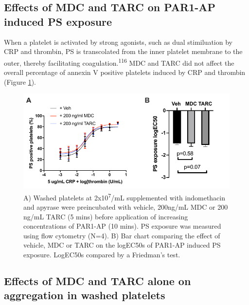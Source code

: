 \documentclass[11pt,twoside]{bristolthesis}
\begin{document}
\hypertarget{effects-of-mdc-and-tarc-on-par1-ap-induced-ps-exposure}{%
\subsection{Effects of MDC and TARC on PAR1-AP induced PS exposure}\label{effects-of-mdc-and-tarc-on-par1-ap-induced-ps-exposure}}

When a platelet is activated by strong agonists, such as dual stimiluation by CRP and thrombin, PS is transcolated from the inner platelet membrane to the outer, thereby facilitating coagulation.\textsuperscript{116} MDC and TARC did not affect the overall percentage of annexin V positive platelets induced by CRP and thrombin (Figure \ref{fig:MDC-TARC-PS-exposure}).



\begin{figure}
\includegraphics{figure/Chemokines/Layouts/MDC_TARC_PS_exposure_layout} \caption[The effect of the chemokines MDC and TARC on PAR1-AP induced PS exposure]{A) Washed platelets at 2x10\textsuperscript{7}/mL supplemented with indomethacin and apyrase were preincubated with vehicle, 200ng/mL MDC or 200 ng/mL TARC (5 mins) before application of increasing concentrations of PAR1-AP (10 mins). PS exposure was measured using flow cytometry (N=4). B) Bar chart comparing the effect of vehicle, MDC or TARC on the logEC50s of PAR1-AP induced PS exposure. LogEC50s compared by a Friedman's test.}\label{fig:MDC-TARC-PS-exposure}
\end{figure}
\hypertarget{effects-of-mdc-and-tarc-alone-on-aggregation-in-washed-platelets}{%
\subsection{Effects of MDC and TARC alone on aggregation in washed platelets}\label{effects-of-mdc-and-tarc-alone-on-aggregation-in-washed-platelets}}
\end{document}
